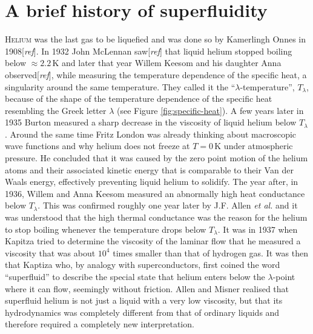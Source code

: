 \documentclass[12pt,a4paper,twosides]{book}
\newcommand{\unit}[1]{\,\mathrm{#1}}
\begin{document}
	\clearpage
	\section{A brief history of superfluidity}
		\lettrine[lines=3,findent=3pt,nindent=0pt]{H}{elium} was the last gas to be liquefied and was done so by Kamerlingh Onnes in 1908[\emph{ref}]. In 1932 John McLennan saw[\emph{ref}] that liquid helium stopped boiling below $\approx\!2.2\unit{K}$ and later that year Willem Keesom and his daughter Anna observed[\emph{ref}], while measuring  the temperature dependence of the specific heat, a singularity around the same temperature. They called it the ``$\lambda$-temperature'',  $T_\lambda$, because of the shape of the temperature dependence of the specific heat resembling the Greek letter $\lambda$ (see Figure \ref{fig:specific-heat}). A few years later in 1935 Burton measured a sharp decrease in the viscosity of liquid helium below $T_\lambda$. Around the same time Fritz London was already thinking about macroscopic wave functions and why helium does not freeze at $T=0\unit{K}$ under atmospheric pressure. He concluded that it was caused by the zero point motion of the helium atoms and their associated kinetic energy that is comparable to their Van der Waals energy, effectively preventing liquid helium to solidify. The year after, in 1936, Willem and Anna Keesom measured an abnormally high heat conductance below $T_\lambda$. This was confirmed roughly one year later by J.F. Allen \emph{et al.} and it was understood that the high thermal conductance was the reason for the helium to stop boiling whenever the temperature drops below $T_\lambda$. It was in 1937 when Kapitza tried to determine the viscosity of the laminar flow that he measured a viscosity that was about $10^4$ times smaller than that of hydrogen gas. It was then that Kaptiza who, by analogy with superconductors, first coined the word ``superfluid'' to describe the special state that helium enters below the $\lambda$-point where it can flow, seemingly without friction. Allen and Misner realised that superfluid helium is not just a liquid with a very low viscosity, but that its hydrodynamics was completely different from that of ordinary liquids and therefore required a completely new interpretation.\\
		
\end{document}
